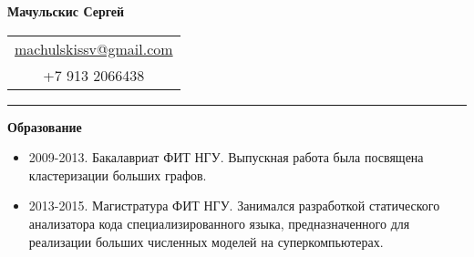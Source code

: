 \documentclass[final]{letter}
\begin{document}
\begin{center}

{\fontsize{25}{40}\selectfont\bf{Мачульскис Сергей}}
  {\hfill
    \begin{tabular}{c}
        \href{mailto:machulskissv@gmail.com}{machulskissv@gmail.com}\\
        +7 913 2066438\\
     \end{tabular}
  }
\rule{.98\textwidth}{1pt}

\addvspace{.1cm}

\end{center}

{\bf Образование}
\begin{itemize}
\item 2009-2013. Бакалавриат ФИТ НГУ. Выпускная работа была посвящена кластеризации больших графов.
\item 2013-2015. Магистратура ФИТ НГУ. Занимался разработкой статического анализатора кода специализированного языка, предназначенного для реализации больших численных моделей на суперкомпьютерах.
\end{itemize}
\end{document}
